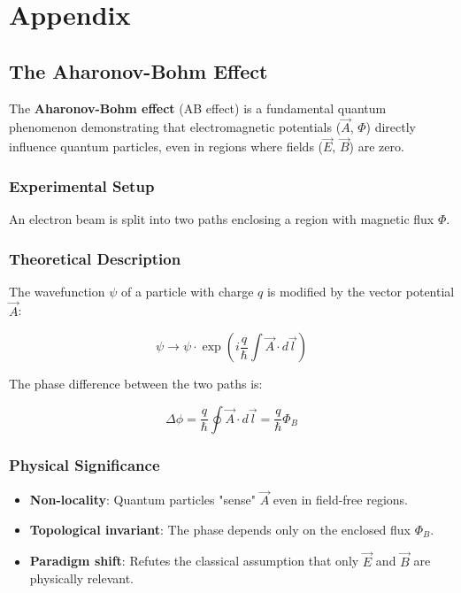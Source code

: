 \chapter{Appendix}
\section{The Aharonov-Bohm Effect}
\label{sec:aharonov-bohm}

The \textbf{Aharonov-Bohm effect} (AB effect) is a fundamental quantum phenomenon demonstrating that electromagnetic potentials ($\vec{A}$, $\Phi$) directly influence quantum particles, even in regions where fields ($\vec{E}$, $\vec{B}$) are zero.

\subsection{Experimental Setup}
An electron beam is split into two paths enclosing a region with magnetic flux $\Phi$.

\subsection{Theoretical Description}
The wavefunction $\psi$ of a particle with charge $q$ is modified by the vector potential $\vec{A}$:

\begin{equation}
\psi \rightarrow \psi \cdot \exp\left(i\frac{q}{\hbar}\int \vec{A}\cdot d\vec{l}\right)
\end{equation}

The phase difference between the two paths is:

\begin{equation}
\Delta\phi = \frac{q}{\hbar}\oint \vec{A}\cdot d\vec{l} = \frac{q}{\hbar}\Phi_B
\end{equation}

\subsection{Physical Significance}
\begin{itemize}
\item \textbf{Non-locality}: Quantum particles "sense" $\vec{A}$ even in field-free regions.
\item \textbf{Topological invariant}: The phase depends only on the enclosed flux $\Phi_B$.
\item \textbf{Paradigm shift}: Refutes the classical assumption that only $\vec{E}$ and $\vec{B}$ are physically relevant.
\end{itemize}

